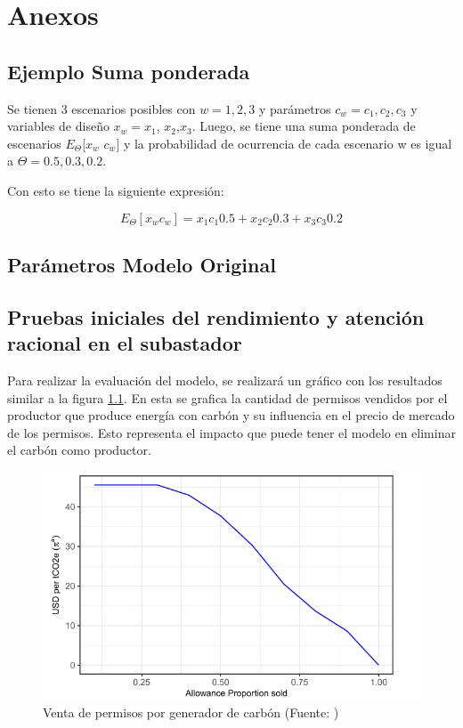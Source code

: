 
\chapter{Anexos}
\label{}



\section{Ejemplo Suma ponderada}\label{ej:sumapond}

Se tienen 3 escenarios posibles con $w = 1,2,3$ y parámetros $c_{w}= c_1,c_2,c_3$ y variables de diseño $x_{w}=x_{1}$, $x_{2}$,$x_{3}$. Luego, se tiene una suma ponderada de escenarios  $E_{\Theta}$[$x_{w}$ $c_{w}$] y la probabilidad de ocurrencia de cada escenario w es igual a $\Theta ={0.5 , 0.3 ,0.2 }$.
\vspace{2.5mm}

Con esto se tiene la siguiente expresión:

$$E_{\Theta} [ x_{w} c_{w}] = x_{1}c_{1}0.5 + x_{2}c_{2}0.3 + x_{3}c_{3}0.2 $$

\section{Parámetros Modelo Original}\label{anexo:parametros}


\section{Pruebas iniciales del rendimiento y atención racional en el subastador}\label{anexo:rendimiento}


Para realizar la evaluación del modelo, se realizará un gráfico con los resultados similar a la figura \ref{fig:fig6}. En esta se grafica la cantidad de permisos vendidos por el productor que produce energía con carbón y su influencia en el precio de mercado de los permisos. Esto representa el impacto que puede tener el modelo en eliminar el carbón como productor.

\begin{figure}[H]
    \centering
    \includegraphics[width=15cm]{docs/DocumentoMemoria/core/images/figura 6 amigo.png}
    \caption{Venta de permisos por generador de carbón (Fuente: \protect{})}
    \label{fig:fig6}
\end{figure}


